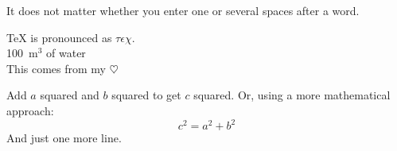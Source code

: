 It does not matter whether you
enter one or several    spaces
after a word.


\TeX{} is pronounced as
$\tau\epsilon\chi$.\\[6pt]
100~m$^{3}$ of water\\[6pt]
This comes from my $\heartsuit$

Add $a$ squared and $b$ squared
to get $c$ squared. Or, using
a more mathematical approach:
\begin{displaymath}
c^{2}=a^{2}+b^{2}
\end{displaymath}
And just one more line.

